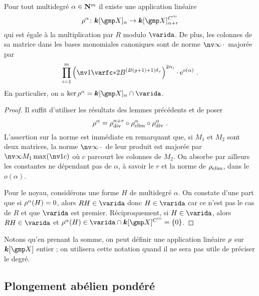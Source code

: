 \begin{lem} \label{l:rfull}
  Pour tout multidegré \( \alpha \in {\mathbf{N}}^m \) il existe une application
  linéaire
  \begin{equation}
    \rfull^\alpha \colon
    \cdn [\vmp]_ {\alpha}
    \to
    \cdn [\vmp]_ {\alpha+r}^{C'''}
  \end{equation}
  qui est égale à la multiplication par \( R \) modulo \( \varida \). De plus,
  les colonnes de sa matrice dans les bases monomiales canoniques sont de
  norme \( \nv\infty\truc \) majorée par
  \begin{equation}
    \prod\fctrange \left(
      \nv1{ \varfc* }
      2 B^{(B(\genre+1) + 1)\dv}
    \right) ^{ 2\alpha_\fct }
    \cdot \expb^{o(\alpha)}
    \pmm.
  \end{equation}
  En particulier, on a \( \ker \rfull^\alpha = \cdn[ \vmp ]_\alpha \cap
    \varida \).
\end{lem}

\begin{proof}
  Il suffit d'utiliser les résultats des lemmes précédents et de poser
  \begin{equation}
    \rho^\alpha
    =
    \rho\sb{\mathrm{div }}^{\alpha+r} \circ \rho\sb{\mathrm{elim}}^{\alpha} \circ \rho\sb{\mathrm{div }}^\alpha
    \text{ .}
  \end{equation}
  L'assertion sur la norme est immédiate en remarquant que, si \( M_1 \) et \(
    M_2 \) sont deux matrices, la norme \( \nv\infty\truc \) de leur produit
  est majorée par \( \nv\infty{M_1} \max(\nv1{c}) \) où \( c \) parcourt les
  colonnes de \( M_2 \). On absorbe par ailleurs les constantes ne dépendant
  pas de \( \alpha \), à savoir le \( r \) et la norme de \( \rho\sb{\mathrm{elim}} \), dans le
  \( o(\alpha) \).

  Pour le noyau, considérons une forme \( H \) de multidegré \( \alpha \). On
  constate d'une part que si \( \rho^\alpha(H) = 0 \), alors \( R H \in
    \varida \) donc \( H \in \varida \) car ce n'est pas le cas de \( R \) et
  que \( \varida \) est premier. Réciproquement, si \( H \in \varida \), alors
  \( RH \in \varida \) et \( \rfull^\alpha(H) \in \varida \cap \cdn[ \vmp
    ]^{C'''} = \set0 \).
\end{proof}

Notons qu'en prenant la somme, on peut définir une application linéaire \(
  \rho \) sur \( \cdn[\vmp] \) entier ; on utilisera cette notation quand il
ne sera pas utile de préciser le degré.


\subsection{Plongement abélien pondéré}
\label{sec:wemb}


